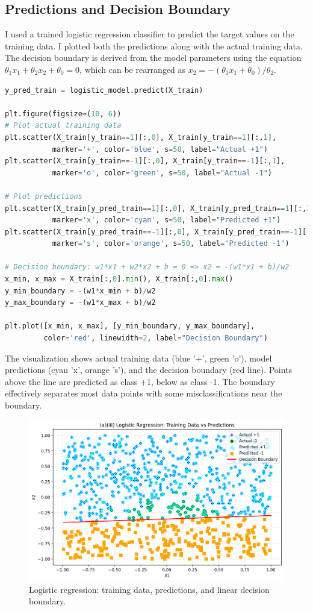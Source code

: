 \documentclass[12pt,a4paper]{article}
\begin{document}
\subsection{Predictions and Decision Boundary}

I used a trained logistic regression classifier to predict the target values on the training data. I plotted both the predictions along with the actual training data. The decision boundary is derived from the model parameters using the equation $\theta_1 x_1 + \theta_2 x_2 + \theta_0 = 0$, which can be rearranged as $x_2 = -(\theta_1 x_1 + \theta_0)/\theta_2$.

\begin{lstlisting}[language=Python, caption={Decision boundary plotting}]
y_pred_train = logistic_model.predict(X_train)

plt.figure(figsize=(10, 6))
# Plot actual training data
plt.scatter(X_train[y_train==1][:,0], X_train[y_train==1][:,1], 
           marker='+', color='blue', s=50, label="Actual +1")
plt.scatter(X_train[y_train==-1][:,0], X_train[y_train==-1][:,1], 
           marker='o', color='green', s=50, label="Actual -1")

# Plot predictions
plt.scatter(X_train[y_pred_train==1][:,0], X_train[y_pred_train==1][:,1], 
           marker='x', color='cyan', s=50, label="Predicted +1")
plt.scatter(X_train[y_pred_train==-1][:,0], X_train[y_pred_train==-1][:,1], 
           marker='s', color='orange', s=50, label="Predicted -1")

# Decision boundary: w1*x1 + w2*x2 + b = 0 => x2 = -(w1*x1 + b)/w2
x_min, x_max = X_train[:,0].min(), X_train[:,0].max()
y_min_boundary = -(w1*x_min + b)/w2
y_max_boundary = -(w1*x_max + b)/w2

plt.plot([x_min, x_max], [y_min_boundary, y_max_boundary], 
         color='red', linewidth=2, label="Decision Boundary")
\end{lstlisting}

The visualization shows actual training data (blue '+', green 'o'), model predictions (cyan 'x', orange 's'), and the decision boundary (red line). Points above the line are predicted as class +1, below as class -1. The boundary effectively separates most data points with some misclassifications near the boundary.

\begin{figure}[H]
    \centering
    \includegraphics[width=0.7\linewidth]{logistic_boundary.png}
    \caption{Logistic regression: training data, predictions, and linear decision boundary.}
    \label{fig:logistic_boundary}
\end{figure}
\end{document}
